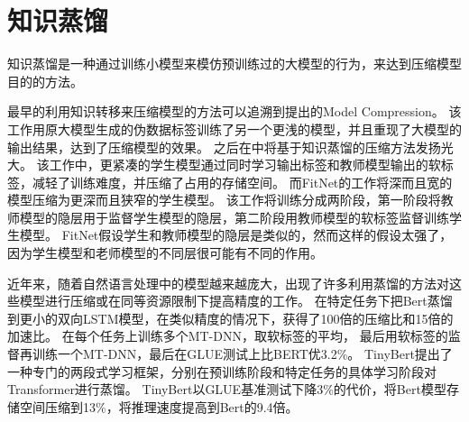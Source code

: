 \section{知识蒸馏}
知识蒸馏是一种通过训练小模型来模仿预训练过的大模型的行为，来达到压缩模型目的的方法。

最早的利用知识转移来压缩模型的方法可以追溯到\citeauthor{buciluǎ2006model}提出的Model Compression\cite{buciluǎ2006model}。
该工作用原大模型生成的伪数据标签训练了另一个更浅的模型，并且重现了大模型的输出结果，达到了压缩模型的效果。
之后\citeauthor{hinton2015distilling}在\parencite{hinton2015distilling}中将基于知识蒸馏的压缩方法发扬光大。
该工作中，更紧凑的学生模型通过同时学习输出标签和教师模型输出的软标签，减轻了训练难度，并压缩了占用的存储空间。
而FitNet\cite{romero2014fitnets}的工作将深而且宽的模型压缩为更深而且狭窄的学生模型。
该工作将训练分成两阶段，第一阶段将教师模型的隐层用于监督学生模型的隐层，第二阶段用教师模型的软标签监督训练学生模型。
FitNet假设学生和教师模型的隐层是类似的，然而这样的假设太强了，因为学生模型和老师模型的不同层很可能有不同的作用。

近年来，随着自然语言处理中的模型越来越庞大，出现了许多利用蒸馏的方法对这些模型进行压缩或在同等资源限制下提高精度的工作。
\parencite{tang2019distilling}在特定任务下把Bert蒸馏到更小的双向LSTM模型，在类似精度的情况下，获得了100倍的压缩比和15倍的加速比。
\parencite{liu2019improving}在每个任务上训练多个MT-DNN，取软标签的平均，
最后用软标签的监督再训练一个MT-DNN，最后在GLUE测试上比BERT优3.2\%。
TinyBert\cite{jiao2019tinybert}提出了一种专门的两段式学习框架，分别在预训练阶段和特定任务的具体学习阶段对Transformer进行蒸馏。
TinyBert以GLUE基准测试下降3\%的代价，将Bert模型存储空间压缩到13\%，将推理速度提高到Bert的9.4倍。